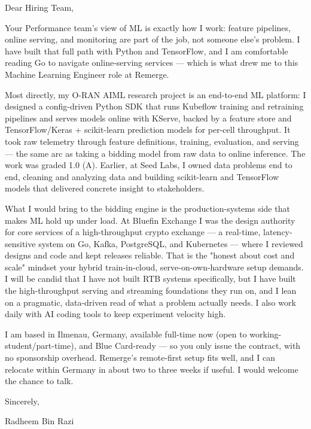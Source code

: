 \documentclass[11pt,a4paper]{coverletter}
\begin{document}

\opening{Dear Hiring Team,}

Your Performance team's view of ML is exactly how I work: feature pipelines, online serving, and monitoring are part of the job, not someone else's problem. I have built that full path with Python and TensorFlow, and I am comfortable reading Go to navigate online-serving services — which is what drew me to this Machine Learning Engineer role at Remerge.

Most directly, my O-RAN AIML research project is an end-to-end ML platform: I designed a config-driven Python SDK that runs Kubeflow training and retraining pipelines and serves models online with KServe, backed by a feature store and TensorFlow/Keras + scikit-learn prediction models for per-cell throughput. It took raw telemetry through feature definitions, training, evaluation, and serving — the same arc as taking a bidding model from raw data to online inference. The work was graded 1.0 (A). Earlier, at Seed Labs, I owned data problems end to end, cleaning and analyzing data and building scikit-learn and TensorFlow models that delivered concrete insight to stakeholders.

What I would bring to the bidding engine is the production-systems side that makes ML hold up under load. At Bluefin Exchange I was the design authority for core services of a high-throughput crypto exchange — a real-time, latency-sensitive system on Go, Kafka, PostgreSQL, and Kubernetes — where I reviewed designs and code and kept releases reliable. That is the "honest about cost and scale" mindset your hybrid train-in-cloud, serve-on-own-hardware setup demands. I will be candid that I have not built RTB systems specifically, but I have built the high-throughput serving and streaming foundations they run on, and I lean on a pragmatic, data-driven read of what a problem actually needs. I also work daily with AI coding tools to keep experiment velocity high.

I am based in Ilmenau, Germany, available full-time now (open to working-student/part-time), and Blue Card-ready — so you only issue the contract, with no sponsorship overhead. Remerge's remote-first setup fits well, and I can relocate within Germany in about two to three weeks if useful. I would welcome the chance to talk.

\closing{Sincerely,}{Radheem Bin Razi}

\clearpage
{}
\end{document}
